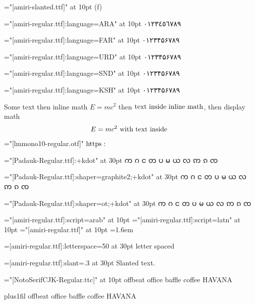 \font\amiriteni="[amiri-slanted.ttf]" at 10pt
({\amiriteni f\/})

\def\l#1#2{%
  \begingroup%
  \font\testl="[amiri-regular.ttf]:language=#1" at 10pt
  \testl #2%
  \endgroup%
}
\l{ARA}{٠١٢٣٤٥٦٧٨٩}\par
\l{FAR}{۰۱۲۳۴۵۶۷۸۹}\par
\l{URD}{۰۱۲۳۴۵۶۷۸۹}\par
\l{SND}{۰۱۲۳۴۵۶۷۸۹}\par
\l{KSH}{۰۱۲۳۴۵۶۷۸۹}\par

Some text then inline math $E=mc^2$ then $\hbox{text inside inline math}$, then
display math $$E=mc^2\hbox{ with text inside}$$

\begingroup
\font\lmmono="[lmmono10-regular.otf]"
\lmmono $\fam0 \textfont0\font https:$
\endgroup

\font\padauk="[Padauk-Regular.ttf]:+kdot" at 30pt\padauk
က ဂ င တ ပ မ ယ လ ဢ ၵ ၸ \par
\font\padauk="[Padauk-Regular.ttf]:shaper=graphite2;+kdot" at 30pt\padauk
က ဂ င တ ပ မ ယ လ ဢ ၵ ၸ \par
\font\padauk="[Padauk-Regular.ttf]:shaper=ot;+kdot"        at 30pt\padauk
က ဂ င တ ပ မ ယ လ ဢ ၵ ၸ \par


\font\arab="[amiri-regular.ttf]:script=arab" at 10pt\arab
\font\latn="[amiri-regular.ttf]:script=latn" at 10pt\latn
\font\dflt="[amiri-regular.ttf]" at 10pt\dflt
\baselineskip=1.6em

\font{}=[amiri-regular.ttf]:letterspace=50 at 30pt
letter spaced

\font\slanted=[amiri-regular.ttf]:slant=.3 at 30pt\slanted
Slanted text.

\endgroup\vfill\eject

\begingroup
\parindent=0pt
\font\notoserifcjk="[NotoSerifCJK-Regular.ttc]" at 10pt
\notoserifcjk
\noindent
\smallskip
offbeat office baffle coffee HAVANA\par
\smallskip
\begingroup
\rightskip=0pt plus1fil  
offbeat office baffle coffee HAVANA\par
\endgroup
\endgroup
\vfill\eject

